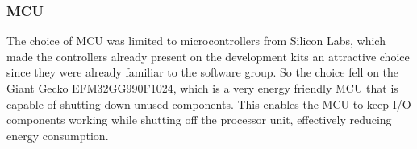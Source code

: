 
\subsubsection{MCU}

The choice of MCU was limited to microcontrollers from Silicon Labs, which made
the controllers already present on the development kits an attractive choice
since they were already familiar to the software group. So the choice fell on
the Giant Gecko EFM32GG990F1024, which is a very energy friendly MCU that is
capable of shutting down unused components. This enables the MCU to keep I/O
components working while shutting off the processor unit, effectively reducing
energy consumption.
